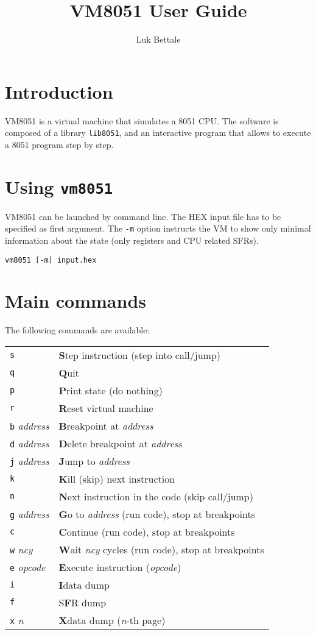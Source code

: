 \documentclass{article}
\title{VM8051 User Guide}
\author{Luk Bettale}
\date{}
\begin{document}
\maketitle

\section*{Introduction}
VM8051 is a virtual machine that simulates a 8051 CPU. The software is
composed of a library \texttt{lib8051}, and an interactive program
that allows to execute a 8051 program step by step.

\section*{Using \texttt{vm8051}}
VM8051 can be launched by command line. The HEX input file has to
be specified as first argument. The \texttt{-m} option instructs the
VM to show only minimal information about the state (only registers
and CPU related SFRs).

\begin{verbatim}
vm8051 [-m] input.hex
\end{verbatim}

\section*{Main commands}
The following commands are available:

\begin{tabular}{ll}
  \texttt{s}&\textbf{S}tep instruction (step into call/jump)\\
  \texttt{q}&\textbf{Q}uit\\
  \texttt{p}&\textbf{P}rint state (do nothing)\\
  \texttt{r}&\textbf{R}eset virtual machine\\
  \texttt{b} \textit{address}&\textbf{B}reakpoint at \textit{address}\\
  \texttt{d} \textit{address}&\textbf{D}elete breakpoint at \textit{address}\\
  \texttt{j} \textit{address}&\textbf{J}ump to \textit{address}\\
  \texttt{k}&\textbf{K}ill (skip) next instruction\\
  \texttt{n}&\textbf{N}ext instruction in the code (skip call/jump)\\
  \texttt{g} \textit{address}&\textbf{G}o to \textit{address} (run
  code), stop at breakpoints\\
  \texttt{c}&\textbf{C}ontinue (run code), stop at breakpoints\\
  \texttt{w} \textit{ncy}&\textbf{W}ait \textit{ncy} cycles (run code),
  stop at breakpoints\\
  \texttt{e} \textit{opcode}&\textbf{E}xecute instruction (\textit{opcode})\\
  \texttt{i}&\textbf{I}data dump\\
  \texttt{f}&S\textbf{F}R dump\\
  \texttt{x} \textit{n}&\textbf{X}data dump (\textit{n}-th page)
\end{tabular}
\end{document}
